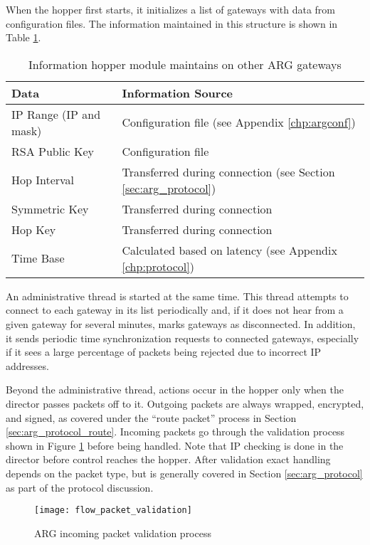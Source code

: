 \par When the hopper first starts, it initializes a list of gateways with data from configuration files. The information maintained in this structure is shown in Table \ref{tab:gatestate}. 

\begin{table}
\caption{Information hopper module maintains on other \ac{ARG} gateways}
\label{tab:gatestate}
\centering
\begin{tabular}{ll}
\toprule
	\textbf{Data} & \textbf{Information Source}\\
	\hline
	IP Range (IP and mask) & Configuration file (see Appendix \ref{chp:argconf})\\
	\ac{RSA} Public Key & Configuration file\\
	Hop Interval & Transferred during connection (see Section \ref{sec:arg_protocol})\\
	Symmetric Key & Transferred during connection\\
	Hop Key & Transferred during connection\\
	Time Base & Calculated based on latency (see Appendix \ref{chp:protocol})\\
\bottomrule
\end{tabular}
\end{table}

\par An administrative thread is started at the same time. This thread attempts to connect to each gateway in its list periodically and, if it does not hear from a given gateway for several minutes, marks gateways as disconnected. In addition, it sends periodic time synchronization requests to connected gateways, especially if it sees a large percentage of packets being rejected due to incorrect \ac{IP} addresses. 

\par Beyond the administrative thread, actions occur in the hopper only when the director passes packets off to it. Outgoing packets are always wrapped, encrypted, and signed, as covered under the ``route packet'' process in Section \ref{sec:arg_protocol_route}. Incoming packets go through the validation process shown in Figure \ref{fig:arg_hopper_in_validation} before being handled. Note that \ac{IP} checking is done in the director before control reaches the hopper. After validation exact handling depends on the packet type, but is generally covered in Section \ref{sec:arg_protocol} as part of the protocol discussion.

\begin{figure}
\caption{\ac{ARG} incoming packet validation process}
\label{fig:arg_hopper_in_validation}
\centering
\texttt{[image: flow\_packet\_validation]}
\end{figure}

